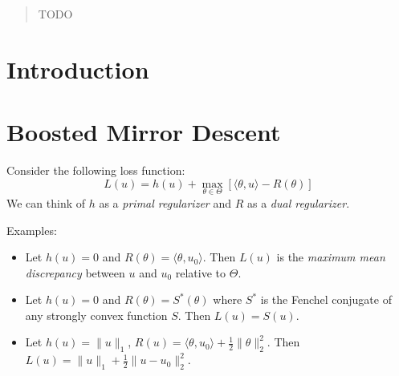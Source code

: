 \documentclass{article}
\begin{document}
 


\begin{abstract} 
TODO
\end{abstract} 

\section{Introduction}
\label{sec:intro}

\section{Boosted Mirror Descent}
\label{sec:algorithm}

Consider the following loss function:
\begin{equation}
L(u) = h(u) + \max_{\theta \in \Theta} [\langle \theta, u \rangle - R(\theta)]
\end{equation}
We can think of $h$ as a \emph{primal regularizer} and $R$ as a \emph{dual regularizer}. 

Examples:
\begin{itemize}
\item Let $h(u) = 0$ and $R(\theta) = \langle \theta, u_0 \rangle$. Then $L(u)$ is the 
      \emph{maximum mean discrepancy} between $u$ and $u_0$ 
      relative to $\Theta$.
\item Let $h(u) = 0$ and $R(\theta) = S^*(\theta)$ where $S^*$ is the Fenchel conjugate of 
      any strongly convex function $S$. Then $L(u) = S(u)$.
\item Let $h(u) = \|u\|_1$, $R(u) = \langle \theta, u_0 \rangle + \frac{1}{2} \|\theta\|_2^2$. 
      Then $L(u) = \|u\|_1 + \frac{1}{2} \|u-u_0\|_2^2$. 
\end{itemize}
\end{document}
